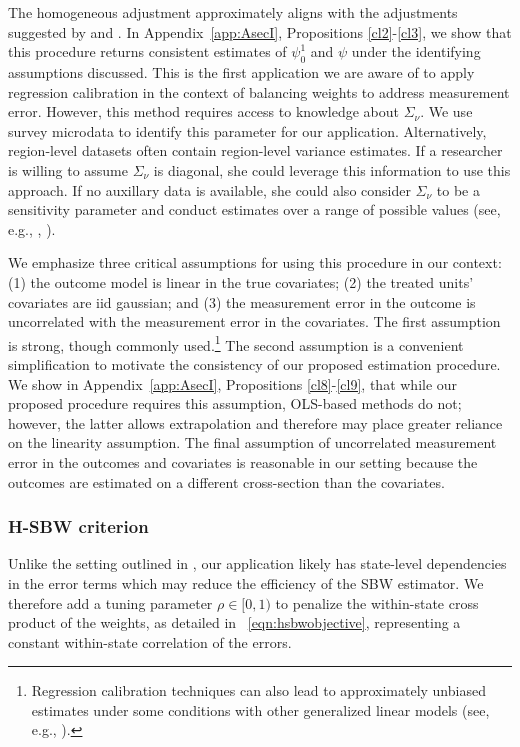 \documentclass[aoas]{imsart}
\theoremstyle{plain}
\theoremstyle{remark}
\begin{document}
The homogeneous adjustment approximately aligns with the adjustments suggested by \cite{carroll2006measurement} and \cite{gleser1992importance}. In Appendix~\ref{app:AsecI}, Propositions \ref{cl2}-\ref{cl3}, we show that this procedure returns consistent estimates of $\psi_0^1$ and $\psi$ under the identifying assumptions discussed. This is the first application we are aware of to apply regression calibration in the context of balancing weights to address measurement error. However, this method requires access to knowledge about $\Sigma_{\nu}$. We use survey microdata to identify this parameter for our application. Alternatively, region-level datasets often contain region-level variance estimates. If a researcher is willing to assume $\Sigma_{\nu}$ is diagonal, she could leverage this information to use this approach. If no auxillary data is available, she could also consider $\Sigma_{\nu}$ to be a sensitivity parameter and conduct estimates over a range of possible values (see, e.g., \cite{illenberger2020impact}, \cite{huque2014impact}). 

We emphasize three critical assumptions for using this procedure in our context: (1) the outcome model is linear in the true covariates; (2) the treated units' covariates are iid gaussian; and (3) the measurement error in the outcome is uncorrelated with the measurement error in the covariates. The first assumption is strong, though commonly used.\footnote{Regression calibration techniques can also lead to approximately unbiased estimates under some conditions with other generalized linear models (see, e.g., \cite{spiegelman2001efficient}).} The second assumption is a convenient simplification to motivate the consistency of our proposed estimation procedure. We show in Appendix~\ref{app:AsecI}, Propositions \ref{cl8}-\ref{cl9}, that while our proposed procedure requires this assumption, OLS-based methods do not; however, the latter  allows extrapolation and therefore may place greater reliance on the linearity assumption. The final assumption of uncorrelated measurement error in the outcomes and covariates is reasonable in our setting because the outcomes are estimated on a different cross-section than the covariates. 

\subsubsection{H-SBW criterion}\label{sssec:hsbw}

Unlike the setting outlined in \cite{zubizarreta2015stable}, our application likely has state-level dependencies in the error terms which may reduce the efficiency of the SBW estimator. We therefore add a tuning parameter $\rho \in [0, 1)$ to penalize the within-state cross product of the weights, as detailed in ~\eqref{eqn:hsbwobjective}, representing a constant within-state correlation of the errors.
\end{document}
